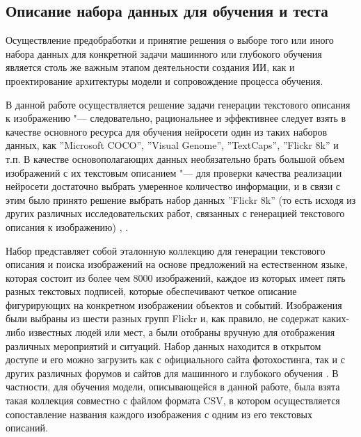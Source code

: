 \documentclass[bachelor, och, coursework]{SCWorks}
\begin{document}
    \subsection{Описание набора данных для обучения и теста}

        Осуществление предобработки и принятие решения о выборе того или иного
        набора данных для конкретной задачи машинного или глубокого обучения
        является столь же важным этапом деятельности создания ИИ, как и
        проектирование архитектуры модели и сопровождение процесса обучения.

        В данной работе осуществляется решение задачи генерации текстового
        описания к изображению "--- следовательно, рациональнее и эффективнее
        следует взять в качестве основного ресурса для обучения нейросети один
        из таких наборов данных, как ''Microsoft COCO'', ''Visual Genome'',
        ''TextCaps'', ''Flickr 8k'' и т.п. В качестве основополагающих данных
        необязательно брать большой объем изображений с их текстовым описанием
        "--- для проверки качества реализации нейросети достаточно выбрать
        умеренное количество информации, и в связи с этим было принято решение
        выбрать набор данных ''Flickr 8k'' (то есть исходя из других различных
        исследовательских работ, связанных с генерацией текстового описания к
        изображению) \cite{dataset1}, \cite{dataset2}.
        
        Набор представляет собой эталонную коллекцию для генерации текстового
        описания и поиска изображений на основе предложений на естественном
        языке, которая состоит из более чем 8000 изображений, каждое из которых
        имеет пять разных текстовых подписей, которые обеспечивают четкое
        описание фигурирующих на конкретном изображении объектов и событий.
        Изображения были выбраны из шести разных групп Flickr и, как правило, не
        содержат каких-либо известных людей или мест, а были отобраны вручную
        для отображения различных мероприятий и ситуаций. Набор данных находится
        в открытом доступе и его можно загрузить как с официального сайта
        фотохостинга, так и с других различных форумов и сайтов для машинного и
        глубокого обучения \cite{dataset3}. В частности, для обучения модели,
        описывающейся в данной работе, была взята такая коллекция совместно с
        файлом формата CSV, в котором осуществляется сопоставление названия
        каждого изображения с одним из его текстовых описаний.
\end{document}
